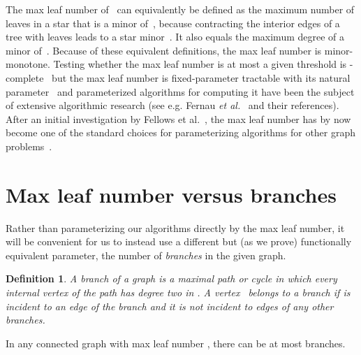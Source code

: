 \documentclass{jgaa-art}
\newtheorem{definition}{Definition}
\begin{document}
The max leaf number of~ can equivalently be defined as the maximum number of leaves in a star  that is a minor of~, because contracting the interior edges of a tree with  leaves leads to a star minor~\cite{FelLan-SJDM-92}. It also equals the maximum degree of a minor of~. Because of these equivalent definitions, the max leaf number is minor-monotone. 
Testing whether the max leaf number is at most a given threshold is -complete~\cite[ND4, p. 206]{GarJoh-79} but the max leaf number is fixed-parameter tractable with its natural parameter~\cite{FelLan-SJDM-92} and parameterized algorithms for computing it have been the subject of extensive algorithmic research (see e.g. Fernau \emph{et al.}~\cite{FerJoaDie-TCS-11} and their references).
After an initial investigation by Fellows et al.~\cite{FelLokNus-TCS-09},
the max leaf number has by now become one of the standard choices for parameterizing algorithms for other graph problems~\cite{AdiChiSau-ISAAC-10,BodJanKra-TCS-13,FelHerRos-ESA-13,Lam-Algo-12,Lam-LMCS-14}.

\section{Max leaf number versus branches}

Rather than parameterizing our algorithms directly by the max leaf number, it will be convenient for us to instead use a different but (as we prove) functionally equivalent parameter, the number of \emph{branches} in the given graph.

\begin{definition}
A \emph{branch} of a graph  is a maximal path or cycle in which every internal vertex of the path has degree two in . A vertex~ \emph{belongs} to a branch if  is incident to an edge of the branch and it is not incident to edges of any other branches.
\end{definition}

\begin{lemma}
\label{lem:branch-upper-bound-by-leaf}
In any connected graph with max leaf number , there can be at most  branches.
\end{lemma}
\end{document}
